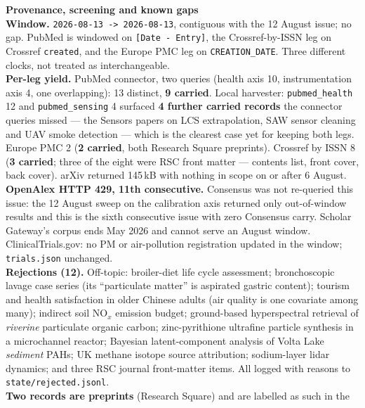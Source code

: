 \documentclass[10pt]{article}
\begin{document}
\vspace{4mm}
\begin{keybox}
{\sffamily\bfseries\footnotesize\color{Deep}Provenance, screening and known gaps}\\[1.2mm]
{\fontsize{7.2}{8.8}\selectfont
\textbf{Window.} \texttt{2026-08-13 -> 2026-08-13}, contiguous with the 12 August issue;
no gap. PubMed is windowed on \texttt{[Date - Entry]}, the Crossref-by-ISSN leg on
Crossref \texttt{created}, and the Europe PMC leg on \texttt{CREATION\_DATE}. Three
different clocks, not treated as interchangeable.\\[0.8mm]
\textbf{Per-leg yield.} PubMed connector, two queries (health axis 10, instrumentation
axis 4, one overlapping): 13 distinct, \textbf{9 carried}. Local harvester:
\texttt{pubmed\_health} 12 and \texttt{pubmed\_sensing} 4 surfaced \textbf{4 further
carried records} the connector queries missed --- the Sensors papers on LCS extrapolation,
SAW sensor cleaning and UAV smoke detection --- which is the clearest case yet for keeping
both legs. Europe PMC 2 (\textbf{2 carried}, both Research Square preprints). Crossref by
ISSN 8 (\textbf{3 carried}; three of the eight were RSC front matter --- contents list,
front cover, back cover). arXiv returned 145\,kB with nothing in scope on or after
6 August. \textbf{OpenAlex HTTP 429, 11th consecutive.} Consensus was not re-queried this
issue: the 12 August sweep on the calibration axis returned only out-of-window results
and this is the sixth consecutive issue with zero Consensus carry. Scholar Gateway's
corpus ends May 2026 and cannot serve an August window. ClinicalTrials.gov: no PM or
air-pollution registration updated in the window; \texttt{trials.json} unchanged.\\[0.8mm]
\textbf{Rejections (12).} Off-topic: broiler-diet life cycle assessment; bronchoscopic
lavage case series (its ``particulate matter'' is aspirated gastric content); tourism and
health satisfaction in older Chinese adults (air quality is one covariate among many);
indirect soil NO$_x$ emission budget; ground-based hyperspectral retrieval of
\emph{riverine} particulate organic carbon; zinc-pyrithione ultrafine particle synthesis
in a microchannel reactor; Bayesian latent-component analysis of Volta Lake
\emph{sediment} PAHs; UK methane isotope source attribution; sodium-layer lidar
dynamics; and three RSC journal front-matter items. All logged with reasons to
\texttt{state/rejected.jsonl}.\\[0.8mm]
\textbf{Two records are preprints} (Research Square) and are labelled as such in the
}
\end{keybox}
\end{document}
